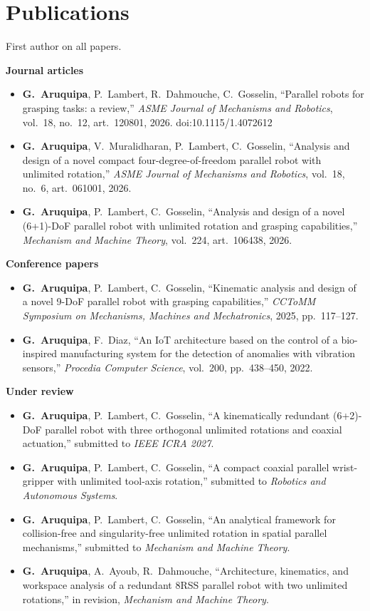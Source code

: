\documentclass[10pt,letterpaper]{article}
\begin{document}
\section{Publications}
{\small First author on all papers.}\par\vspace{2pt}
\textbf{Journal articles}
\begin{itemize}
\item \textbf{G.~Aruquipa}, P.~Lambert, R.~Dahmouche, C.~Gosselin, ``Parallel robots for grasping tasks: a review,''
\emph{ASME Journal of Mechanisms and Robotics}, vol.~18, no.~12, art.~120801, 2026. doi:10.1115/1.4072612
\item \textbf{G.~Aruquipa}, V.~Muralidharan, P.~Lambert, C.~Gosselin, ``Analysis and design of a novel compact
four-degree-of-freedom parallel robot with unlimited rotation,'' \emph{ASME Journal of Mechanisms and Robotics},
vol.~18, no.~6, art.~061001, 2026.
\item \textbf{G.~Aruquipa}, P.~Lambert, C.~Gosselin, ``Analysis and design of a novel (6+1)-DoF parallel robot with
unlimited rotation and grasping capabilities,'' \emph{Mechanism and Machine Theory}, vol.~224, art.~106438, 2026.
\end{itemize}
\textbf{Conference papers}
\begin{itemize}
\item \textbf{G.~Aruquipa}, P.~Lambert, C.~Gosselin, ``Kinematic analysis and design of a novel 9-DoF parallel robot
with grasping capabilities,'' \emph{CCToMM Symposium on Mechanisms, Machines and Mechatronics}, 2025, pp.~117--127.
\item \textbf{G.~Aruquipa}, F.~Diaz, ``An IoT architecture based on the control of a bio-inspired manufacturing system
for the detection of anomalies with vibration sensors,'' \emph{Procedia Computer Science}, vol.~200, pp.~438--450, 2022.
\end{itemize}
\textbf{Under review}
\begin{itemize}
\item \textbf{G.~Aruquipa}, P.~Lambert, C.~Gosselin, ``A kinematically redundant (6+2)-DoF parallel robot with three
orthogonal unlimited rotations and coaxial actuation,'' submitted to \emph{IEEE ICRA 2027}.
\item \textbf{G.~Aruquipa}, P.~Lambert, C.~Gosselin, ``A compact coaxial parallel wrist-gripper with unlimited
tool-axis rotation,'' submitted to \emph{Robotics and Autonomous Systems}.
\item \textbf{G.~Aruquipa}, P.~Lambert, C.~Gosselin, ``An analytical framework for collision-free and singularity-free
unlimited rotation in spatial parallel mechanisms,'' submitted to \emph{Mechanism and Machine Theory}.
\item \textbf{G.~Aruquipa}, A.~Ayoub, R.~Dahmouche, ``Architecture, kinematics, and workspace analysis of a redundant
8RSS parallel robot with two unlimited rotations,'' in revision, \emph{Mechanism and Machine Theory}.
\end{itemize}
\end{document}
